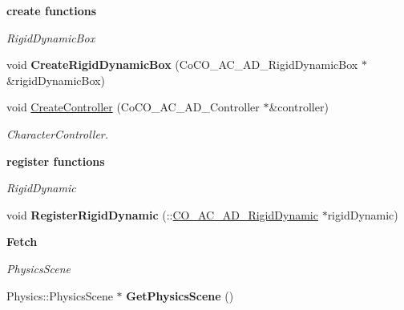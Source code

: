 \begin{Indent}{\bf create functions}\par
{\em \label{_amgrp51b34d861ebe0927d3cb889fc3d4b9ff}
 RigidDynamicBox }\begin{DoxyCompactItemize}
\item 
\hypertarget{classContent_1_1CO__SC__AD__Scene_a510d11c8ca2d7ee07b6a2dca2cd6b70b}{
void {\bfseries CreateRigidDynamicBox} (CoCO\_\-AC\_\-AD\_\-RigidDynamicBox $\ast$\&rigidDynamicBox)}
\label{classContent_1_1CO__SC__AD__Scene_a510d11c8ca2d7ee07b6a2dca2cd6b70b}

\item 
\hypertarget{classContent_1_1CO__SC__AD__Scene_a0680a77cda6cdbbd1265263531b6f4e4}{
void \hyperlink{classContent_1_1CO__SC__AD__Scene_a0680a77cda6cdbbd1265263531b6f4e4}{CreateController} (CoCO\_\-AC\_\-AD\_\-Controller $\ast$\&controller)}
\label{classContent_1_1CO__SC__AD__Scene_a0680a77cda6cdbbd1265263531b6f4e4}

\begin{DoxyCompactList}\small\item\em CharacterController. \item\end{DoxyCompactList}\end{DoxyCompactItemize}
\end{Indent}
\begin{Indent}{\bf register functions}\par
{\em \label{_amgrp74151e0c44c9df43fcf80837230dbc8a}
 RigidDynamic }\begin{DoxyCompactItemize}
\item 
\hypertarget{classContent_1_1CO__SC__AD__Scene_a4005ce86d38672e9b78e2742280a0784}{
void {\bfseries RegisterRigidDynamic} (::\hyperlink{classContent_1_1Actor_1_1Admin_1_1RigidDynamic}{CO\_\-AC\_\-AD\_\-RigidDynamic} $\ast$rigidDynamic)}
\label{classContent_1_1CO__SC__AD__Scene_a4005ce86d38672e9b78e2742280a0784}

\end{DoxyCompactItemize}
\end{Indent}
\begin{Indent}{\bf Fetch}\par
{\em \label{_amgrp4ea7755f84f02d23876d90be2f9765cf}
 PhysicsScene }\begin{DoxyCompactItemize}
\item 
\hypertarget{classContent_1_1CO__SC__AD__Scene_abd48ddce95338557c2dd12de3cb80372}{
Physics::PhysicsScene $\ast$ {\bfseries GetPhysicsScene} ()}
\label{classContent_1_1CO__SC__AD__Scene_abd48ddce95338557c2dd12de3cb80372}

\end{DoxyCompactItemize}
\end{Indent}
